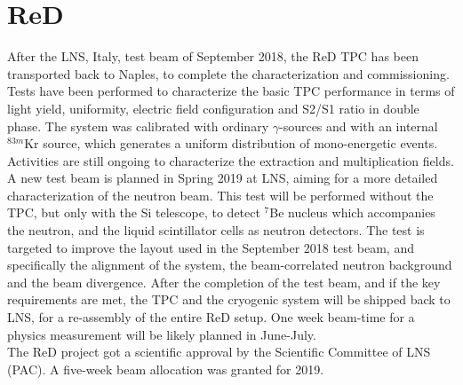 \section{ReD} \label{sec:ReD}


After the LNS, Italy, test beam of September 2018, the ReD TPC has been transported back to Naples,  to 
complete the characterization and commissioning. Tests have been performed to characterize the 
basic TPC performance in terms of light yield, uniformity, electric field configuration and S2/S1 
ratio in double phase. The system was calibrated with ordinary $\gamma$-sources and with an 
internal $^{83m}$Kr source, which generates a uniform distribution of mono-energetic events. 
Activities are still ongoing to characterize the extraction and multiplication fields.\\
A new test beam is planned in Spring 2019 at LNS, aiming for a more detailed characterization of 
the neutron beam. This test will be performed without the TPC, but only with the Si telescope, to 
detect $^{7}$Be nucleus which accompanies the neutron, and the liquid scintillator cells as neutron 
detectors. The test is targeted to improve the layout used in the September 2018 test beam, and 
specifically the alignment of the system, the beam-correlated neutron background and the beam 
divergence. After the completion of the test beam, and if the key requirements are met, the 
TPC and the cryogenic system will be shipped back to LNS, for a re-assembly of the entire ReD 
setup. One week beam-time for a physics measurement will be likely planned in June-July. \\
The ReD project got a scientific approval by the Scientific Committee of LNS (PAC). A five-week 
beam allocation was granted for 2019.   
